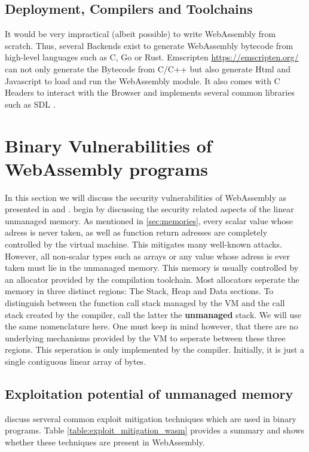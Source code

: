 \documentclass[sigconf]{acmart}
\begin{document}
\subsection{Deployment, Compilers and Toolchains}
It would be very impractical (albeit possible) to write WebAssembly from scratch. Thus, several Backends exist to generate WebAssembly bytecode from high-level languages such as C, Go or Rust. Emscripten \url{https://emscripten.org/} can not only generate the Bytecode from C/C++ but also generate Html and Javascript to load and run the WebAssembly module. It also comes with C Headers to interact with the Browser and implements several common libraries such as SDL \cite{sdl2}.  

\section{Binary Vulnerabilities of WebAssembly programs}
\label{sec:binary_vulns}
In this section we will discuss the security vulnerabilities of WebAssembly as presented in \cite{mcfadden_security_2018} and \cite{lehmann_everything_2020}. \cite{lehmann_everything_2020} begin by discussing the security related aspects of the linear unmanaged memory. As mentioned in \ref{sec:memories}, every scalar value whose adress is never taken, as well as function return adresses are completely controlled by the virtual machine. This mitigates many well-known attacks. However, all non-scalar types such as arrays or any value whose adress is ever taken must lie in the unmanaged memory. This memory is usually controlled by an allocator provided by the compilation toolchain. Most allocators seperate the memory in three distinct regions: The Stack, Heap and Data sections. To distinguish between the function call stack managed by the VM and the call stack created by the compiler, \cite{lehmann_everything_2020} call the latter the \textbf{unmanaged} stack. We will use the same nomenclature here. One must keep in mind however, that there are no underlying mechanisms provided by the VM to seperate between these three regions. This seperation is only implemented by the compiler. Initially, it is just a single contiguous linear array of bytes. 

\subsection{Exploitation potential of unmanaged memory}
\cite{mcfadden_security_2018} discuss serveral common exploit mitigation techniques which are used in binary programs. Table \ref{table:exploit_mitigation_wasm} provides a summary and shows whether these techniques are present in WebAssembly.
\end{document}
